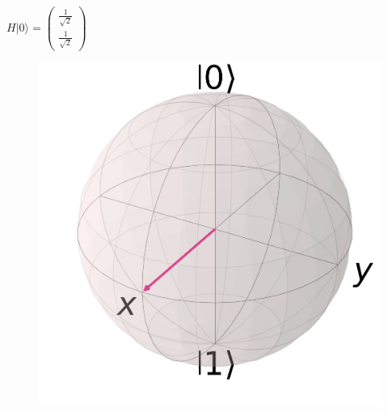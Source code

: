 \documentclass{beamer}
\newcommand{\ket}[1]{\lvert#1\rangle} %
\begin{document}
\begin{frame}
\begin{columns}[c]
		\begin{column}{.3\textwidth}
			\centering
			$H\ket{0} = \begin{pmatrix}
			\frac{1}{\sqrt{2}}\\
			\frac{1}{\sqrt{2}}
			\end{pmatrix}$
			\begin{figure}
				\centering
				\includegraphics[width=1\textwidth]{qubith.png}            
			\end{figure}
		\end{column}
	\end{columns}
		    
\end{frame}
\end{document}
